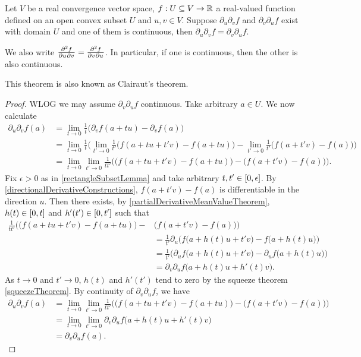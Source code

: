 \begin{theorem} \label{SchwarzTheorem}
Let $V$ be a real convergence vector space, $f:U\subseteq V\to \mathbb{R}$ a real-valued function defined on an open convex subset $U$ and $u,v\in V$. Suppose $\partial_u\partial_v f$ and $\partial_v\partial_u f$ exist with domain $U$ and one of them is continuous, then $\partial_u\partial_v f = \partial_v\partial_u f$.
\end{theorem}
We also write $\md{f}{2}{u}{}{v}{} = \md{f}{2}{v}{}{u}{}$. In particular, if one is continuous, then the other is also continuous.

This theorem is also known as Clairaut's theorem.
\begin{proof}
WLOG we may assume $\partial_v\partial_u f$ continuous. Take arbitrary $a\in U$. We now calculate
\begin{align*}
\partial_u\partial_v f(a) &= \lim_{t\to 0}\frac{1}{t}\big(\partial_v f(a+tu) - \partial_v f(a)\big) \\
&= \lim_{t\to 0}\frac{1}{t}\Big(\lim_{t'\to 0}\frac{1}{t'}\big(f(a+tu+t'v) - f(a+tu)\big) - \lim_{t'\to 0}\frac{1}{t'}\big(f(a+t'v) - f(a)\big)\Big) \\
&= \lim_{t\to 0}\lim_{t'\to 0}\frac{1}{tt'}\Big(\big(f(a+tu+t'v) - f(a+tu)\big) - \big(f(a+t'v) - f(a)\big)\Big).
\end{align*}
Fix $\epsilon > 0$ as in \ref{rectangleSubsetLemma} and take arbitrary $t,t'\in \interval{0, \epsilon}$. By \ref{directionalDerivativeConstructions}, $f(a+t'v) - f(a)$ is differentiable in the direction $u$. Then there exists, by \ref{partialDerivativeMeanValueTheorem}, $h(t) \in \interval{0,t}$ and $h'(t')\in \interval{0,t'}$ such that
\begin{align*}
\frac{1}{tt'}\Big(\big(f(a+tu+t'v) - f(a+tu)\big) - &\big(f(a+t'v) - f(a)\big)\Big) \\
&= \frac{1}{t'}\partial_u\Big(f\big(a+h(t)u+t'v\big) - f\big(a+h(t)u\big)\Big) \\
&= \frac{1}{t'}\Big(\partial_uf\big(a+h(t)u+t'v\big) - \partial_uf\big(a+h(t)u\big)\Big) \\
&= \partial_v\partial_uf\big(a+h(t)u+h'(t)v\big).
\end{align*}
As $t\to 0$ and $t'\to 0$, $h(t)$ and $h'(t')$ tend to zero by the squeeze theorem \ref{squeezeTheorem}. By continuity of $\partial_v\partial_uf$, we have
\begin{align*}
\partial_u\partial_v f(a) &= \lim_{t\to 0}\lim_{t'\to 0}\frac{1}{tt'}\Big(\big(f(a+tu+t'v) - f(a+tu)\big) - \big(f(a+t'v) - f(a)\big)\Big) \\
&= \lim_{t\to 0}\lim_{t'\to 0}\partial_v\partial_uf\big(a+h(t)u+h'(t)v\big) \\
&= \partial_v\partial_u f(a).
\end{align*}
\end{proof}
